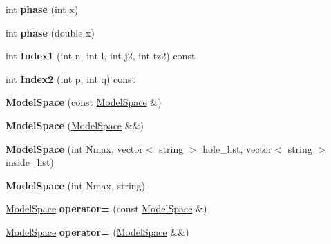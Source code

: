 \begin{DoxyCompactItemize}
\item 
\hypertarget{classModelSpace_a6b4d1686088e3fef492df10bbd806fe2}{int {\bfseries phase} (int x)}\label{classModelSpace_a6b4d1686088e3fef492df10bbd806fe2}

\item 
\hypertarget{classModelSpace_a07d1c8f00131cc6c192d440e6be329f3}{int {\bfseries phase} (double x)}\label{classModelSpace_a07d1c8f00131cc6c192d440e6be329f3}

\item 
\hypertarget{classModelSpace_ab9e4a36b032abc3fcd81da8b2a8707d2}{int {\bfseries Index1} (int n, int l, int j2, int tz2) const }\label{classModelSpace_ab9e4a36b032abc3fcd81da8b2a8707d2}

\item 
\hypertarget{classModelSpace_acb31fdcb54a8fe3168378969176f0157}{int {\bfseries Index2} (int p, int q) const }\label{classModelSpace_acb31fdcb54a8fe3168378969176f0157}

\item 
\hypertarget{classModelSpace_a9554b9bc74b82e392fafc9de496fce5f}{{\bfseries Model\-Space} (const \hyperlink{classModelSpace}{Model\-Space} \&)}\label{classModelSpace_a9554b9bc74b82e392fafc9de496fce5f}

\item 
\hypertarget{classModelSpace_a6fe287e59b9aca7719a553f7dedcd2d7}{{\bfseries Model\-Space} (\hyperlink{classModelSpace}{Model\-Space} \&\&)}\label{classModelSpace_a6fe287e59b9aca7719a553f7dedcd2d7}

\item 
\hypertarget{classModelSpace_a1d93cd1705e0f5dd3421e7617dbbc16e}{{\bfseries Model\-Space} (int Nmax, vector$<$ string $>$ hole\-\_\-list, vector$<$ string $>$ inside\-\_\-list)}\label{classModelSpace_a1d93cd1705e0f5dd3421e7617dbbc16e}

\item 
\hypertarget{classModelSpace_a75259e2dbe635145cb2f3973866e941f}{{\bfseries Model\-Space} (int Nmax, string)}\label{classModelSpace_a75259e2dbe635145cb2f3973866e941f}

\item 
\hypertarget{classModelSpace_a2b01062b499979b919b7b77b04745cbe}{\hyperlink{classModelSpace}{Model\-Space} {\bfseries operator=} (const \hyperlink{classModelSpace}{Model\-Space} \&)}\label{classModelSpace_a2b01062b499979b919b7b77b04745cbe}

\item 
\hypertarget{classModelSpace_ab1d44cc22730d233506daa4f6e83187c}{\hyperlink{classModelSpace}{Model\-Space} {\bfseries operator=} (\hyperlink{classModelSpace}{Model\-Space} \&\&)}\label{classModelSpace_ab1d44cc22730d233506daa4f6e83187c}


\end{DoxyCompactItemize}
